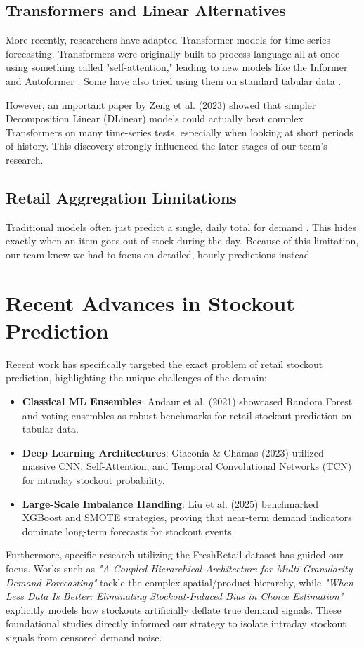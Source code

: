 \subsection{Transformers and Linear Alternatives}
More recently, researchers have adapted Transformer models for time-series forecasting. Transformers were originally built to process language all at once using something called "self-attention," leading to new models like the Informer \cite{zhou2021informer} and Autoformer \cite{wu2021autoformer}. Some have also tried using them on standard tabular data \cite{gorishniy2021revisiting}. 

However, an important paper by Zeng et al. (2023) \cite{zeng2023dlinear} showed that simpler Decomposition Linear (DLinear) models could actually beat complex Transformers on many time-series tests, especially when looking at short periods of history. This discovery strongly influenced the later stages of our team's research.

\subsection{Retail Aggregation Limitations}
Traditional models often just predict a single, daily total for demand \cite{syntetos2016}. This hides exactly when an item goes out of stock during the day. Because of this limitation, our team knew we had to focus on detailed, hourly predictions instead.

\section{Recent Advances in Stockout Prediction}

Recent work has specifically targeted the exact problem of retail stockout prediction, highlighting the unique challenges of the domain:

\begin{itemize}
    \item \textbf{Classical ML Ensembles}: Andaur et al. (2021) showcased Random Forest and voting ensembles as robust benchmarks for retail stockout prediction on tabular data.
    \item \textbf{Deep Learning Architectures}: Giaconia \& Chamas (2023) utilized massive CNN, Self-Attention, and Temporal Convolutional Networks (TCN) for intraday stockout probability.
    \item \textbf{Large-Scale Imbalance Handling}: Liu et al. (2025) benchmarked XGBoost and SMOTE strategies, proving that near-term demand indicators dominate long-term forecasts for stockout events.
\end{itemize}

Furthermore, specific research utilizing the FreshRetail dataset has guided our focus. Works such as \textit{"A Coupled Hierarchical Architecture for Multi-Granularity Demand Forecasting"} tackle the complex spatial/product hierarchy, while \textit{"When Less Data Is Better: Eliminating Stockout-Induced Bias in Choice Estimation"} explicitly models how stockouts artificially deflate true demand signals. These foundational studies directly informed our strategy to isolate intraday stockout signals from censored demand noise.
